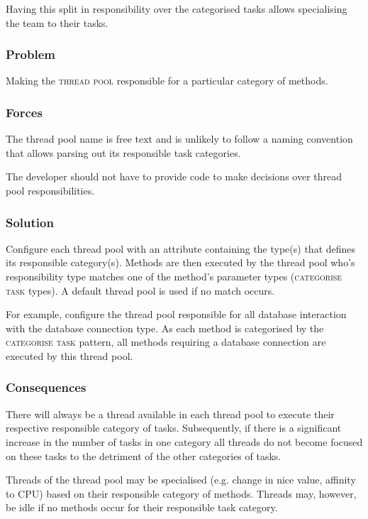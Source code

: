 \documentclass[prodmode]{style/acmlarge}
\begin{document}
Having this split in responsibility over the categorised tasks allows
specialising the team to their tasks.

\subsubsection*{Problem} Making the \textsc{thread pool} responsible for a
particular category of methods.

\subsubsection*{Forces} The thread pool name is free text and is unlikely to
follow a naming convention that allows parsing out its responsible task
categories.

The developer should not have to provide code to make decisions over thread pool
responsibilities.

\subsubsection*{Solution} Configure each thread pool with an attribute
containing the type(s) that defines its responsible category(s).  Methods are
then executed by the thread pool who's responsibility type matches one of the
method's parameter types (\textsc{categorise task} types).  A default thread
pool is used if no match occurs.

For example, configure the thread pool responsible for all database interaction
with the database connection type.  As each method is categorised by the
\textsc{categorise task} pattern, all methods requiring a database connection
are executed by this thread pool.

\subsubsection*{Consequences} There will always be a thread available in each
thread pool to execute their respective responsible category of tasks. 
Subsequently, if there is a significant increase in the number of tasks in one
category all threads do not become focused on these tasks to the detriment of
the other categories of tasks.

Threads of the thread pool may be specialised (e.g. change in nice value,
affinity to CPU) based on their responsible category of methods.  Threads may,
however, be idle if no methods occur for their responsible task category.
\end{document}
